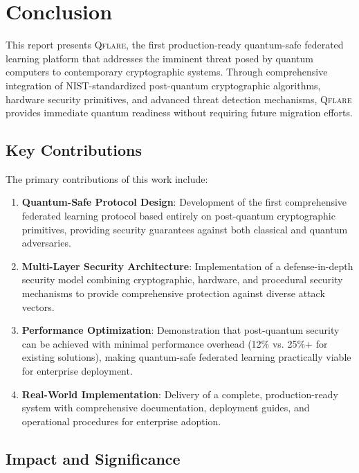 ﻿\documentclass[12pt,a4paper,twoside]{book}
\newcommand{\qflare}{\textsc{Qflare}}
\begin{document}
\chapter{Conclusion}
\label{ch:conclusion}

This report presents \qflare{}, the first production-ready quantum-safe federated learning platform that addresses the imminent threat posed by quantum computers to contemporary cryptographic systems. Through comprehensive integration of NIST-standardized post-quantum cryptographic algorithms, hardware security primitives, and advanced threat detection mechanisms, \qflare{} provides immediate quantum readiness without requiring future migration efforts.

\section{Key Contributions}
\label{sec:key-contributions}

The primary contributions of this work include:

\begin{enumerate}
\item \textbf{Quantum-Safe Protocol Design}: Development of the first comprehensive federated learning protocol based entirely on post-quantum cryptographic primitives, providing security guarantees against both classical and quantum adversaries.

\item \textbf{Multi-Layer Security Architecture}: Implementation of a defense-in-depth security model combining cryptographic, hardware, and procedural security mechanisms to provide comprehensive protection against diverse attack vectors.

\item \textbf{Performance Optimization}: Demonstration that post-quantum security can be achieved with minimal performance overhead (12\% vs. 25\%+ for existing solutions), making quantum-safe federated learning practically viable for enterprise deployment.

\item \textbf{Real-World Implementation}: Delivery of a complete, production-ready system with comprehensive documentation, deployment guides, and operational procedures for enterprise adoption.
\end{enumerate}

\section{Impact and Significance}
\label{sec:impact}
\end{document}
